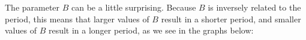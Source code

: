 The parameter $B$ can be a little surprising.  Because $B$ is inversely related to the
period, this means that larger values of $B$ result in a shorter period, and smaller
values of $B$ result in a longer period, as we see in the graphs below:
\begin{center}

\end{center}
